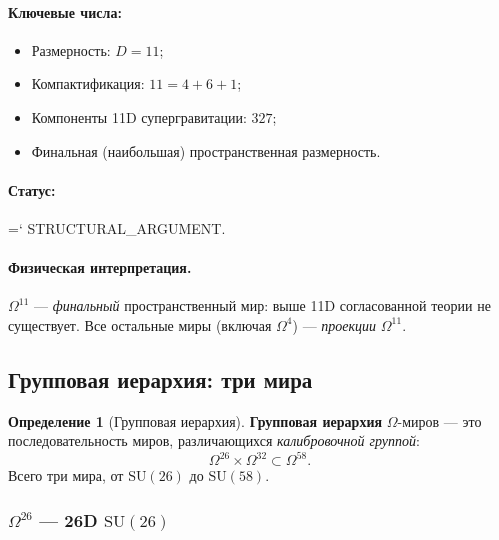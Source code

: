 \documentclass[11pt,a4paper]{article}
\newcommand{\SU}{\mathrm{SU}}
\newcommand{\Om}{\Omega^4}
\newcommand{\Ome}{\Omega^{11}}
\newcommand{\Omtw}{\Omega^{26}}
\newcommand{\Omth}{\Omega^{32}}
\newcommand{\Omfi}{\Omega^{58}}
\renewcommand{\texttt}[1]{{\ttfamily\hyphenchar\font=`\- #1}}
\theoremstyle{definition}
\newtheorem{definition}[theorem]{Определение}
\begin{document}
\paragraph{Ключевые числа:}
\begin{itemize}
    \item Размерность: $D = 11$;
    \item Компактификация: $11 = 4 + 6 + 1$;
    \item Компоненты 11D супергравитации: $327$;
    \item Финальная (наибольшая) пространственная размерность.
\end{itemize}

\paragraph{Статус:} \texttt{STRUCTURAL\_ARGUMENT}.

\paragraph{Физическая интерпретация.}
$\Ome$ — \emph{финальный} пространственный мир: выше 11D 
согласованной теории не существует. Все остальные миры 
(включая $\Om$) --- \emph{проекции} $\Ome$.

\subsection{Групповая иерархия: три мира}
\label{subsec:group-hierarchy}

\begin{definition}[Групповая иерархия]
\label{def:group-hierarchy}
\textbf{Групповая иерархия} $\Omega$-миров — это 
последовательность миров, различающихся \emph{калибровочной 
группой}:
\begin{equation}
    \Omtw \times \Omth \subset \Omfi.
\end{equation}
Всего три мира, от $\SU(26)$ до $\SU(58)$.
\end{definition}

\subsubsection{$\Omtw$ --- 26D $\SU(26)$}
\end{document}
